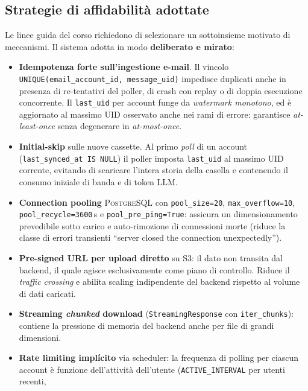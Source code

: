 \documentclass[11pt,a4paper,oneside]{article}
\begin{document}
\subsection{Strategie di affidabilit\`a adottate}
Le linee guida del corso richiedono di selezionare un sottoinsieme motivato di
meccanismi. Il sistema adotta in modo \textbf{deliberato e mirato}:

\begin{itemize}[leftmargin=*]
    \item \textbf{Idempotenza forte sull'ingestione e-mail}.
        Il vincolo \texttt{UNIQUE(email\_account\_id, message\_uid)} impedisce
        duplicati anche in presenza di re-tentativi del poller, di crash con
        replay o di doppia esecuzione concorrente. Il \texttt{last\_uid} per
        account funge da \emph{watermark monotono}, ed \`e aggiornato al massimo
        UID osservato anche nei rami di errore: garantisce \emph{at-least-once}
        senza degenerare in \emph{at-most-once}.
    \item \textbf{Initial-skip} sulle nuove cassette.
        Al primo \emph{poll} di un account (\texttt{last\_synced\_at IS NULL})
        il poller imposta \texttt{last\_uid} al massimo UID corrente, evitando
        di scaricare l'intera storia della casella e contenendo il consumo
        iniziale di banda e di token LLM.
    \item \textbf{Connection pooling} \textsc{PostgreSQL} con
        \texttt{pool\_size=20}, \texttt{max\_overflow=10},
        \texttt{pool\_recycle=3600}\,s e \texttt{pool\_pre\_ping=True}: assicura
        un dimensionamento prevedibile sotto carico e auto-rimozione di
        connessioni morte (riduce la classe di errori transienti
        ``server closed the connection unexpectedly'').
    \item \textbf{Pre-signed URL per upload diretto} su S3: il dato non transita
        dal backend, il quale agisce esclusivamente come piano di controllo.
        Riduce il \emph{traffic crossing} e abilita scaling indipendente del
        backend rispetto al volume di dati caricati.
    \item \textbf{Streaming \emph{chunked} download} (\texttt{StreamingResponse}
        con \texttt{iter\_chunks}): contiene la pressione di memoria del
        backend anche per file di grandi dimensioni.
    \item \textbf{Rate limiting impl\'icito} via scheduler: la frequenza di
        polling per ciascun account \`e funzione dell'attivit\`a dell'utente
        (\texttt{ACTIVE\_INTERVAL} per utenti recenti,

\end{itemize}
\end{document}
